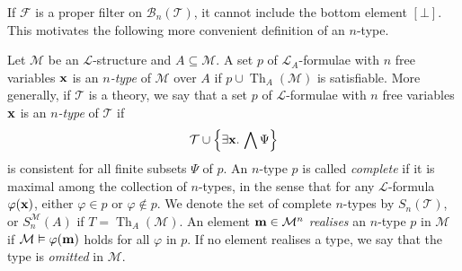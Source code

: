 \begin{remark}
    If \( \mathcal F \) is a proper filter on \( \mathcal B_n(\mathcal T) \), it cannot include the bottom element \( [\bot] \).
    This motivates the following more convenient definition of an \( n \)-type.
\end{remark}
\begin{definition}
    Let \( \mathcal M \) be an \( \mathcal L \)-structure and \( A \subseteq \mathcal M \).
    A set \( p \) of \( \mathcal L_A \)-formulae with \( n \) free variables \( \vb x \) is an \emph{\( n \)-type} of \( \mathcal M \) over \( A \) if \( p \cup \operatorname{Th}_A(\mathcal M) \) is satisfiable.
    More generally, if \( \mathcal T \) is a theory, we say that a set \( p \) of \( \mathcal L \)-formulae with \( n \) free variables \( \vb x \) is an \emph{\( n \)-type} of \( \mathcal T \) if
    \[ \mathcal T \cup \qty{\exists \vb x.\, \bigwedge \Psi} \]
    is consistent for all finite subsets \( \Psi \) of \( p \).
    An \( n \)-type \( p \) is called \emph{complete} if it is maximal among the collection of \( n \)-types, in the sense that for any \( \mathcal L \)-formula \( \varphi(\vb x) \), either \( \varphi \in p \) or \( \varphi \notin p \).
    We denote the set of complete \( n \)-types by \( S_n(\mathcal T) \), or \( S_n^{\mathcal M}(A) \) if \( T = \operatorname{Th}_A(\mathcal M) \).
    An element \( \vb m \in \mathcal M^n \) \emph{realises} an \( n \)-type \( p \) in \( \mathcal M \) if \( \mathcal M \vDash \varphi(\vb m) \) holds for all \( \varphi \) in \( p \).
    If no element realises a type, we say that the type is \emph{omitted} in \( \mathcal M \).
\end{definition}
